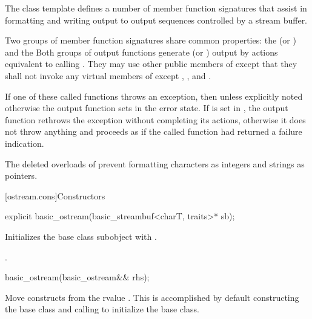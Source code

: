 \pnum
The class template
defines a number of member function
signatures that assist in formatting and writing output to output sequences
controlled by a stream buffer.

\pnum
Two groups of member function signatures share common properties:
the
(or
)
and the
Both groups of output functions generate (or
)
output
by actions equivalent to calling
.
They may use other public members of
except that they shall not invoke any virtual members of
except
,
,
and
.

\pnum
If one of these called functions throws an exception, then unless explicitly noted otherwise
the output function sets
in the error state.
If
is set in
,
the output function
rethrows the exception without completing its actions, otherwise
it does not throw anything and proceeds as if the called function had returned
a failure indication.

\pnum
\begin{note}
The deleted overloads of 
prevent formatting characters as integers and strings as pointers.
\end{note}

[ostream.cons]{Constructors}

%
\begin{itemdecl}
explicit basic_ostream(basic_streambuf<charT, traits>* sb);
\end{itemdecl}

%
\begin{itemdescr}
\pnum
\effects
Initializes the base class subobject with
.

\pnum
\ensures
{}.
\end{itemdescr}

%
\begin{itemdecl}
basic_ostream(basic_ostream&& rhs);
\end{itemdecl}

\begin{itemdescr}
\pnum
\effects
Move constructs from the rvalue .
This is accomplished by default constructing the base class and calling
 to initialize the
base class.
\end{itemdescr}

